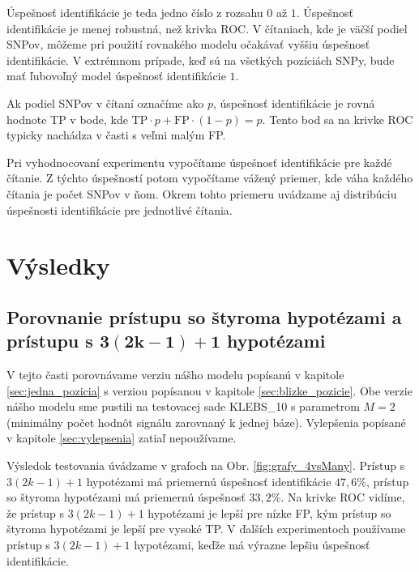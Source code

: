 Úspešnosť identifikácie je teda jedno číslo z rozsahu $0$ až $1$. Úspešnosť identifikácie je menej robustná,
než krivka ROC. V čítaniach, kde je väčší podiel SNPov, môžeme pri použití rovnakého modelu očakávať vyššiu úspešnosť identifikácie.
V extrémnom prípade, keď sú na všetkých pozíciách SNPy, bude mať ľubovoľný model úspešnosť identifikácie $1$.

Ak podiel SNPov v čítaní označíme ako $p$, úspešnosť identifikácie je rovná hodnote TP v bode, 
kde $\mathrm{TP} \cdot p + \mathrm{FP} \cdot (1-p) = p$. Tento bod sa na krivke ROC typicky nachádza v časti s
veľmi malým FP.

Pri vyhodnocovaní experimentu vypočítame úspešnosť identifikácie pre každé čítanie. Z týchto úspešností potom vypočítame
vážený priemer, kde váha každého čítania je počet SNPov v ňom. Okrem tohto priemeru uvádzame aj distribúciu 
úspešnosti identifikácie pre jednotlivé čítania.


\section{Výsledky}

\subsection[Porovnanie prístupu so štyroma hypotézami a prístupu s $3(2k-1)+1$ hypotézami]{Porovnanie prístupu so štyroma hypotézami a prístupu s $\boldsymbol{3(2k-1)+1}$ hypotézami}
\label{exp:4vsMany}
V tejto časti porovnávame verziu nášho modelu popísanú v kapitole \ref{sec:jedna_pozicia} s
verziou popísanou v kapitole \ref{sec:blizke_pozicie}.
Obe verzie nášho modelu sme pustili na testovacej sade KLEBS\_10 s parametrom $M=2$ (minimálny počet hodnôt signálu zarovnaný k jednej báze).
Vylepšenia popísané v kapitole \ref{sec:vylepsenia} zatiaľ nepoužívame.


Výsledok testovania úvádzame v grafoch na Obr. \ref{fig:grafy_4vsMany}.
Prístup s $3(2k-1)+1$ hypotézami má priemernú úspešnosť identifikácie $47,6 \%$, prístup so štyroma hypotézami má
priemernú úspešnosť $33,2 \%$.
Na krivke ROC vidíme, že prístup s $3(2k-1)+1$ hypotézami je lepší pre nízke FP, 
kým prístup so štyroma hypotézami je lepší pre vysoké TP. 
V ďalších experimentoch používame prístup s $3(2k-1)+1$ hypotézami, keďže má výrazne lepšiu úspešnosť identifikácie.

